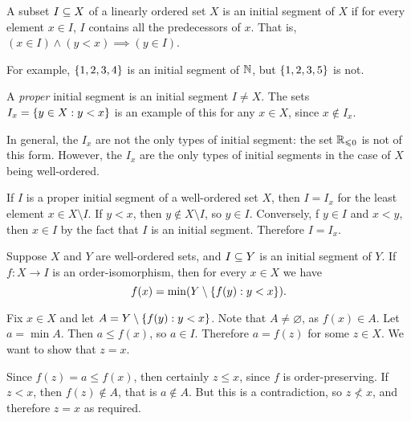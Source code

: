 \documentclass{article}
\begin{document}
\begin{definition}
	\label{initial-segment}
    A subset $I \subseteq X$ of a linearly ordered set $X$ is an initial segment of $X$ if for every element $x \in I$, $I$ contains all the predecessors of $x$. That is, $(x \in I) \land (y < x) \implies (y \in I)$.
    
    For example, $\left\lbrace 1, 2, 3, 4 \right\rbrace$ is an initial segment of $\mathbb{N}$, but $\left\lbrace 1, 2, 3, 5 \right\rbrace$ is not.
    
    A \textit{proper} initial segment is an initial segment $I \neq X$. The sets $I_x = \left\lbrace y \in X: y < x \right\rbrace$ is an example of this for any $x \in X$, since $x \notin I_x$.
\end{definition}

\begin{corollary}
    In general, the $I_x$ are not the only types of initial segment: the set $\mathbb{R}_{\leqslant 0}$ is not of this form. However, the $I_x$ are the only types of initial segments in the case of $X$ being well-ordered.
\end{corollary}

\begin{prf}
    If $I$ is a proper initial segment of a well-ordered set $X$, then $I = I_x$ for the least element $x \in X \setminus I$. If $y < x$, then $y \notin X \setminus I$, so $y \in I$. Conversely, f $y \in I$ and $x < y$, then $x \in I$ by the fact that $I$ is an initial segment. Therefore $I = I_x$.
\end{prf}

\begin{proposition}
	\label{order-isomorphism-restriction}
    Suppose $X$ and $Y$ are well-ordered sets, and $I \subseteq Y$ is an initial segment of $Y$. If $f: X \to I$ is an order-isomorphism, then for every $x \in X$ we have
    \[
	f(x) = \min (Y \setminus \left\lbrace f(y) : y < x \right\rbrace).
	\]
\end{proposition}

\begin{prf}
    Fix $x \in X$ and let $A = Y \setminus \left\lbrace f(y) : y < x \right\rbrace$. Note that $A \neq \varnothing$, as $f(x) \in A$. Let $a = \min A$. Then $a \leq f(x)$, so $a \in I$. Therefore $a = f(z)$ for some $z \in X$. We want to show that $z = x$.
    
    Since $f(z) = a \leq f(x)$, then certainly $z \leq x$, since $f$ is order-preserving. If $z < x$, then $f(z) \notin A$, that is $a \notin A$. But this is a contradiction, so $z \not< x$, and therefore $z = x$ as required.
\end{prf}
\end{document}
